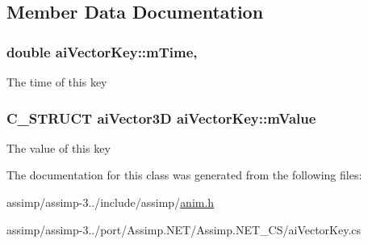 \subsection{Member Data Documentation}
\hypertarget{structai_vector_key_ab3c43c166434c7a505083d1929f675bc}{
\subsubsection[{m\+Time}]{\setlength{\rightskip}{0pt plus 5cm}double ai\+Vector\+Key\+::m\+Time\hspace{0.3cm}{\ttfamily [get]}, {\ttfamily [set]}}}\label{structai_vector_key_ab3c43c166434c7a505083d1929f675bc}
The time of this key \hypertarget{structai_vector_key_a6f73649028b136a193dac21de35188ad}{
\subsubsection[{m\+Value}]{\setlength{\rightskip}{0pt plus 5cm}C\+\_\+\+S\+T\+R\+U\+C\+T {\bf ai\+Vector3\+D} ai\+Vector\+Key\+::m\+Value}}\label{structai_vector_key_a6f73649028b136a193dac21de35188ad}
The value of this key 

The documentation for this class was generated from the following files\+:\begin{DoxyCompactItemize}
\item 
assimp/assimp-\/3../include/assimp/\hyperlink{anim_8h}{anim.\+h}\item 
assimp/assimp-\/3../port/\+Assimp.\+N\+E\+T/\+Assimp.\+N\+E\+T\+\_\+\+C\+S/ai\+Vector\+Key.\+cs\end{DoxyCompactItemize}
